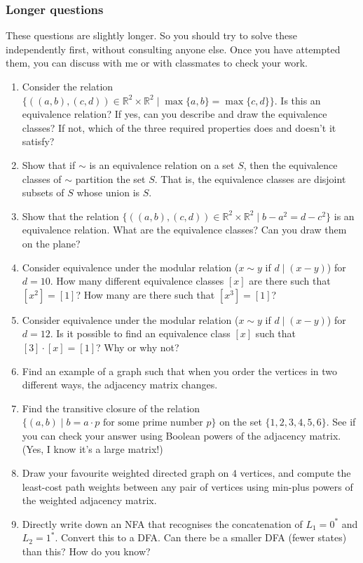 \documentclass{amsart}
\begin{document}
\subsubsection{Longer questions}
\label{sec:orgb75769c}
These questions are slightly longer. So you should try to solve these independently first, without consulting anyone else. Once you have attempted them, you can discuss with me or with classmates to check your work.
\begin{enumerate}
\item Consider the relation \(\{((a,b),(c,d)) \in \mathbb{R}^2 \times \mathbb{R}^2 \mid \operatorname{max}\{a,b\} = \operatorname{max}\{c,d\}\}\). Is this an equivalence relation? If yes, can you describe and draw the equivalence classes? If not, which of the three required properties does and doesn't it satisfy?
\item Show that if \(\sim\) is an equivalence relation on a set \(S\), then the equivalence classes of \(\sim\) partition the set \(S\). That is, the equivalence classes are disjoint subsets of \(S\) whose union is \(S\).
\item Show that the relation \(\{((a,b),(c,d)) \in \mathbb{R}^2 \times \mathbb{R}^2\mid b - a^2 = d - c^2\}\) is an equivalence relation. What are the equivalence classes? Can you draw them on the plane?
\item Consider equivalence under the modular relation (\(x \sim y\) if \(d \mid (x-y)\)) for \(d = 10\). How many different equivalence classes \([x]\) are there such that \([x^2] = [1]\)? How many are there such that \([x^3] = [1]\)?
\item Consider equivalence under the modular relation (\(x \sim y\) if \(d \mid (x-y)\)) for \(d = 12\).
Is it possible to find an equivalence class \([x]\) such that \([3]\cdot [x] = [1]\)? Why or why not?
\item Find an example of a graph such that when you order the vertices in two different ways, the adjacency matrix changes.
\item Find the transitive closure of the relation \(\{(a,b) \mid b = a\cdot p\text{ for some prime number }p\}\) on the set \(\{1,2,3,4,5,6\}\). See if you can check your answer using Boolean powers of the adjacency matrix. (Yes, I know it's a large matrix!)
\item Draw your favourite weighted directed graph on \(4\) vertices, and compute the least-cost path weights between any pair of vertices using min-plus powers of the weighted adjacency matrix.
\item Directly write down an NFA that recognises the concatenation of \(L_1 = 0^{*}\) and \(L_2 = 1^{*}\). Convert this to a DFA.  Can there be a smaller DFA (fewer states) than this?  How do you know?

\end{enumerate}
\end{document}
